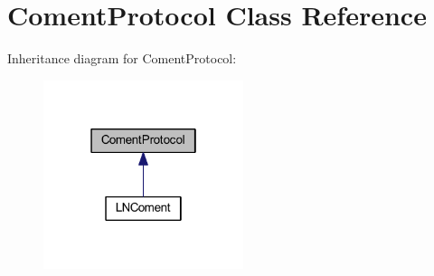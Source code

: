 \hypertarget{class_coment_protocol}{\section{Coment\-Protocol Class Reference}
\label{class_coment_protocol}
}


Inheritance diagram for Coment\-Protocol\-:\nopagebreak
\begin{figure}[H]
\begin{center}
\leavevmode
\includegraphics[width=166pt]{class_coment_protocol__inherit__graph}
\end{center}
\end{figure}
